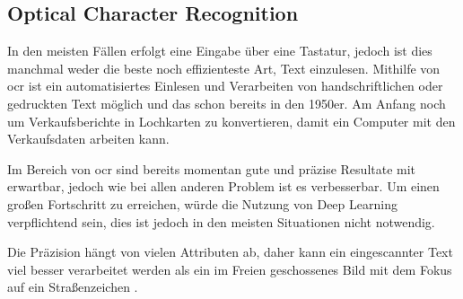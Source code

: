 \subsection{Optical Character Recognition}

In den meisten Fällen erfolgt eine Eingabe über eine Tastatur, jedoch ist dies manchmal weder die beste noch effizienteste Art, Text einzulesen. Mithilfe von \gls{ocr} ist ein automatisiertes Einlesen und Verarbeiten von handschriftlichen oder gedruckten Text möglich und das schon bereits in den 1950er. Am Anfang noch um Verkaufsberichte in Lochkarten zu konvertieren, damit ein Computer mit den Verkaufsdaten arbeiten kann. \cite{OCR:online}

Im Bereich von \gls{ocr} sind bereits momentan gute und präzise Resultate mit  erwartbar, jedoch wie bei allen anderen Problem ist es verbesserbar. Um einen großen Fortschritt zu erreichen, würde die Nutzung von Deep Learning verpflichtend sein, dies ist jedoch in den meisten Situationen nicht notwendig.

Die Präzision hängt von vielen Attributen ab, daher kann ein eingescannter Text viel besser verarbeitet werden als ein im Freien geschossenes Bild mit dem Fokus auf ein Straßenzeichen \cite{OCR2:online}.

